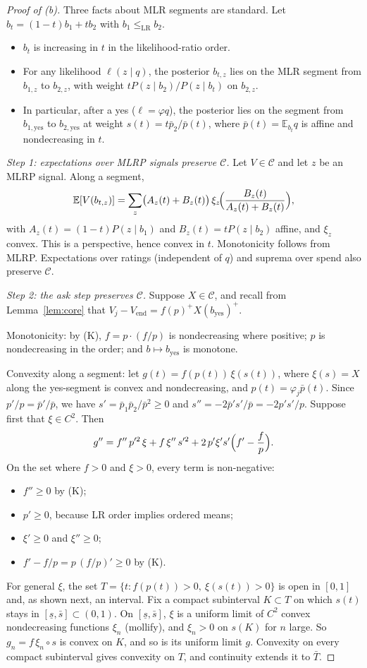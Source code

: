 \documentclass[11pt,a4paper]{article}
\theoremstyle{definition}
\theoremstyle{remark}
\newcommand{\E}{\mathbb{E}}
\newcommand{\Vend}{V_{\mathrm{end}}}
\begin{document}
\begin{proof}[Proof of (b)]
Three facts about MLR segments are standard. Let $b_t=(1-t)b_1+tb_2$ with $b_1\le_{\mathrm{LR}}b_2$.
\begin{itemize}[nosep]
\item $b_t$ is increasing in $t$ in the likelihood-ratio order.
\item For any likelihood $\ell(z\mid q)$, the posterior $b_{t,z}$ lies on the MLR segment from $b_{1,z}$ to $b_{2,z}$, with weight $tP(z\mid b_2)/P(z\mid b_t)$ on $b_{2,z}$.
\item In particular, after a yes ($\ell=\varphi q$), the posterior lies on the segment from $b_{1,\mathrm{yes}}$ to $b_{2,\mathrm{yes}}$ at weight $s(t)=t\bar p_2/\bar p(t)$, where $\bar p(t)=\E_{b_t}q$ is affine and nondecreasing in $t$.
\end{itemize}

\emph{Step 1: expectations over MLRP signals preserve $\mathcal C$.} Let $V\in\mathcal C$ and let $z$ be an MLRP signal. Along a segment,
\[
\E[V(b_{t,z})]=\sum_z\bigl(A_z(t)+B_z(t)\bigr)\,\xi_z\!\Bigl(\frac{B_z(t)}{A_z(t)+B_z(t)}\Bigr),
\]
with $A_z(t)=(1-t)P(z\mid b_1)$ and $B_z(t)=tP(z\mid b_2)$ affine, and $\xi_z$ convex. This is a perspective, hence convex in $t$. Monotonicity follows from MLRP. Expectations over ratings (independent of $q$) and suprema over spend also preserve $\mathcal C$.

\emph{Step 2: the ask step preserves $\mathcal C$.} Suppose $X\in\mathcal C$, and recall from Lemma~\ref{lem:core} that $V_j-\Vend=f(p)^+X(b_{\mathrm{yes}})^+$.

Monotonicity: by (K), $f=p\cdot(f/p)$ is nondecreasing where positive; $p$ is nondecreasing in the order; and $b\mapsto b_{\mathrm{yes}}$ is monotone.

Convexity along a segment: let $g(t)=f(p(t))\,\xi(s(t))$, where $\xi(s)=X$ along the yes-segment is convex and nondecreasing, and $p(t)=\varphi_j\bar p(t)$. Since $p'/p=\bar p'/\bar p$, we have $s'=\bar p_1\bar p_2/\bar p^2\ge0$ and $s''=-2\bar p's'/\bar p=-2p's'/p$. Suppose first that $\xi\in C^2$. Then
\[
g''=f''\,p'^2\,\xi+f\,\xi''\,s'^2+2\,p'\xi's'\Bigl(f'-\frac fp\Bigr).
\]
On the set where $f>0$ and $\xi>0$, every term is non-negative:
\begin{itemize}[nosep]
\item $f''\ge0$ by (K);
\item $p'\ge0$, because LR order implies ordered means;
\item $\xi'\ge0$ and $\xi''\ge0$;
\item $f'-f/p=p\,(f/p)'\ge0$ by (K).
\end{itemize}
For general $\xi$, the set $T=\{t:f(p(t))>0,\ \xi(s(t))>0\}$ is open in $[0,1]$ and, as shown next, an interval. Fix a compact subinterval $K\subset T$ on which $s(t)$ stays in $[\underline s,\bar s]\subset(0,1)$. On $[\underline s,\bar s]$, $\xi$ is a uniform limit of $C^2$ convex nondecreasing functions $\xi_n$ (mollify), and $\xi_n>0$ on $s(K)$ for $n$ large. So $g_n=f\,\xi_n\circ s$ is convex on $K$, and so is its uniform limit $g$. Convexity on every compact subinterval gives convexity on $T$, and continuity extends it to $\bar T$.


\end{proof}
\end{document}

